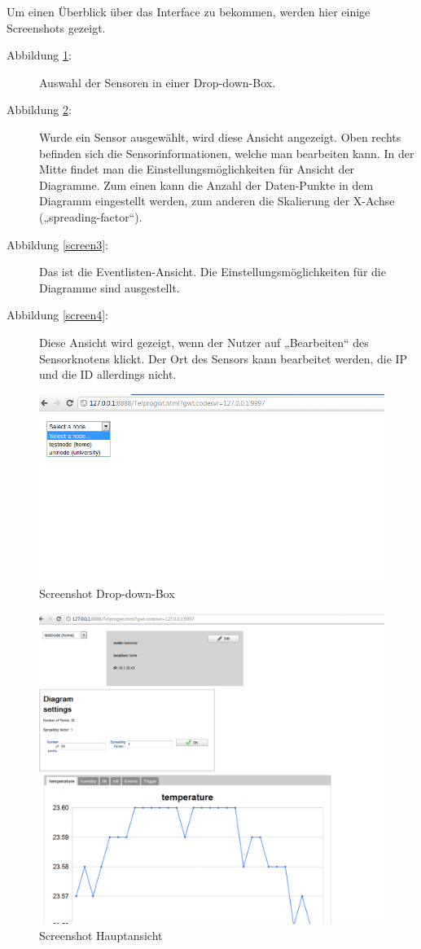 \documentclass[12pt,a4paper,twoside]{article}
\begin{document}
Um einen Überblick über das Interface zu bekommen, werden hier einige Screenshots gezeigt.   
\begin{description}
\item[Abbildung \ref{screen1}:] Auswahl der Sensoren in einer Drop-down-Box. 
\item[Abbildung \ref{screen2}:] Wurde ein Sensor ausgewählt, wird diese Ansicht angezeigt. Oben rechts befinden sich die Sensorinformationen, welche man bearbeiten kann. In der Mitte findet man die Einstellungsmöglichkeiten für Ansicht der Diagramme. Zum einen kann die Anzahl der Daten-Punkte in dem Diagramm eingestellt werden, zum anderen die Skalierung der X-Achse („spreading-factor“).
\item[Abbildung \ref{screen3}:] Das ist die Eventlisten-Ansicht. Die Einstellungsmöglichkeiten für die Diagramme sind ausgestellt.
\item[Abbildung \ref{screen4}:] Diese Ansicht wird gezeigt, wenn der Nutzer auf „Bearbeiten“ des Sensorknotens klickt. Der Ort des Sensors kann bearbeitet werden, die IP und die ID allerdings nicht.
\end{description}

\begin{figure}[h!]
   \centering
   \includegraphics[width=12cm]{fig/screen1.png}
   \caption{Screenshot Drop-down-Box}
   \label{screen1}
\end{figure}

\begin{figure}[h!]
   \centering
   \includegraphics[width=12cm]{fig/screen2.png}
   \caption{Screenshot Hauptansicht}
   \label{screen2}
\end{figure}
\end{document}
